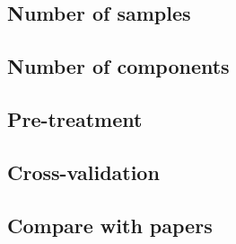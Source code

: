 \documentclass[a4paper,12pt,titlepage]{article} %
\numberwithin{equation}{section}  %
\begin{document}
	\subsection{Number of samples}
	\label{sec:Number of Samples}
	
	\subsection{Number of components}
	\label{sec:Number of Components}
	
	\subsection{Pre-treatment}
	\label{sec:Pre-treatment}
	
	\subsection{Cross-validation}
	\label{sec:Cross-Validation}
	
	\subsection{Compare with papers}
	\label{sec:Compare with papers}
	
	
	
\end{document}
